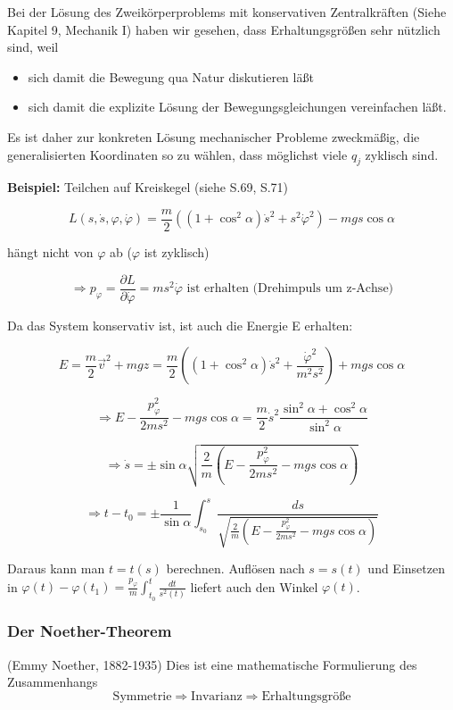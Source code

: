 \documentclass[10pt, letterpaper]{article}
\begin{document}
Bei der Lösung des Zweikörperproblems mit konservativen Zentralkräften (Siehe Kapitel 9, Mechanik I) haben wir gesehen, dass Erhaltungsgrößen sehr nützlich sind, weil
\begin{itemize}
\item sich damit die Bewegung qua Natur diskutieren läßt
\item sich damit die explizite Lösung der Bewegungsgleichungen vereinfachen läßt.
\end{itemize}

Es ist daher zur konkreten Lösung mechanischer Probleme zweckmäßig, die generalisierten Koordinaten so zu wählen, dass möglichst viele $q_j$ zyklisch sind.

\textbf{Beispiel:} Teilchen auf Kreiskegel (siehe S.69, S.71)

\[L(s,\dot{s},\varphi,\dot{\varphi}) = \frac{m}{2}\left((1+\cos^2\alpha)\dot{s}^2 + s^2\dot{\varphi}^2\right) - mgs\cos\alpha\]

hängt nicht von $\varphi$ ab ($\varphi$ ist zyklisch)

\[\Rightarrow p_\varphi = \frac{\partial L}{\partial \dot{\varphi}} = ms^2\dot{\varphi} \text{ ist erhalten (Drehimpuls um z-Achse)}\]

Da das System konservativ ist, ist auch die Energie E erhalten:

\[E = \frac{m}{2}\vec{v}^2 + mgz = \frac{m}{2}\left((1+\cos^2\alpha)\dot{s}^2 + \frac{\dot{\varphi}^2}{m^2s^2}\right) + mgs\cos\alpha\]

\[\Rightarrow E - \frac{p_\varphi^2}{2ms^2} - mgs\cos\alpha = \frac{m}{2}\dot{s}^2\frac{\sin^2\alpha+\cos^2\alpha}{\sin^2\alpha}\]

\[\Rightarrow \dot{s} = \pm\sin\alpha\sqrt{\frac{2}{m}\left(E - \frac{p_\varphi^2}{2ms^2} - mgs\cos\alpha\right)}\]

\[\Rightarrow t-t_0 = \pm\frac{1}{\sin\alpha}\int_{s_0}^s\frac{ds}{\sqrt{\frac{2}{m}\left(E - \frac{p_\varphi^2}{2ms^2} - mgs\cos\alpha\right)}}\]

Daraus kann man $t=t(s)$ berechnen. Auflösen nach $s=s(t)$ und Einsetzen in $\varphi(t)-\varphi(t_1)=\frac{p_\varphi}{m}\int_{t_0}^t\frac{dt}{s^2(t)}$ liefert auch den Winkel $\varphi(t)$.



\subsubsection{Der Noether-Theorem} 

(Emmy Noether, 1882-1935) Dies ist eine mathematische Formulierung des Zusammenhangs
\[
\text{Symmetrie} \Rightarrow \text{Invarianz} \Rightarrow \text{Erhaltungsgröße}
\]
\end{document}
